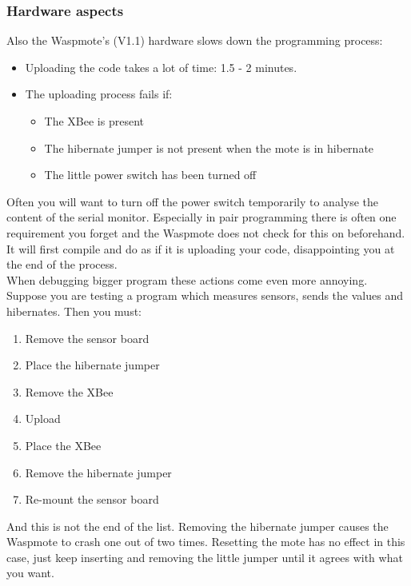 \subsubsection{Hardware aspects}
Also the Waspmote's (V1.1) hardware slows down the programming process:
\begin{itemize}
\item Uploading the code takes a lot of time: 1.5 - 2 minutes.
\item The uploading process fails if:
\begin{itemize}
\item The XBee is present
\item The hibernate jumper is not present when the mote is in hibernate
\item The little power switch has been turned off
\end{itemize}
\end{itemize}
Often you will want to turn off the power switch temporarily to analyse the content of the serial monitor. Especially in pair programming there is often one requirement you forget and the Waspmote does not check for this on beforehand. It will first compile and do as if it is uploading your code, disappointing you at the end of the process.\\
When debugging bigger program these actions come even more annoying. Suppose you are testing a program which measures sensors, sends the values and hibernates. Then you must:
\begin{enumerate}
\item Remove the sensor board
\item Place the hibernate jumper
\item Remove the XBee
\item Upload
\item Place the XBee
\item Remove the hibernate jumper
\item Re-mount the sensor board
\end{enumerate}
And this is not the end of the list. Removing the hibernate jumper causes the Waspmote to crash one out of two times. Resetting the mote has no effect in this case, just keep inserting and removing the little jumper until it agrees with what you want.
\vfill